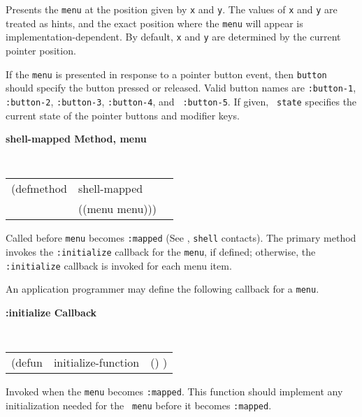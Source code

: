 \begin{flushright} \parbox[t]{6.125in}{ Presents the {\tt menu} at the
position given by {\tt x} and {\tt y}.  The values of {\tt x} and {\tt y} are
treated as hints, and the exact position where the {\tt menu} will appear is
implementation-dependent.  By default, {\tt x} and {\tt y} are determined by the
current pointer position.
 
If the {\tt menu} is presented in response to a pointer button event, then
{\tt button} should specify the button pressed or released. Valid button names
are {\tt :button-1}, {\tt :button-2}, {\tt :button-3}, {\tt :button-4}, and {\tt
:button-5}. If given, {\tt
state} specifies the current state of the pointer buttons and modifier keys.

}\end{flushright}

{\samepage
{\large {\bf shell-mapped \hfill Method, menu}}
\begin{flushright} \parbox[t]{6.125in}{
\tt
\begin{tabular}{lll}
\raggedright
(defmethod & shell-mapped & \\
& ((menu  menu)))
\end{tabular}
\rm

}\end{flushright}}


\begin{flushright} \parbox[t]{6.125in}{ Called before {\tt menu} becomes
{\tt :mapped} (See \cite{clue}, {\tt shell} contacts).  The primary
method
invokes the {\tt :initialize} callback for the {\tt menu}, if defined;
otherwise, the {\tt :initialize} callback is invoked for each menu
item.}\end{flushright}



An application programmer may define the following callback for
a {\tt menu}.

{\samepage
{\large {\bf :initialize \hfill Callback}} 
\begin{flushright} 
\parbox[t]{6.125in}{
\tt
\begin{tabular}{lll}
\raggedright
(defun & initialize-function & () )
\end{tabular}
\rm

}\end{flushright}}

\begin{flushright} \parbox[t]{6.125in}{
Invoked when the {\tt menu} becomes {\tt :mapped}.
This function should implement any initialization needed for the {\tt
menu} before it becomes {\tt :mapped}.

}\end{flushright}

